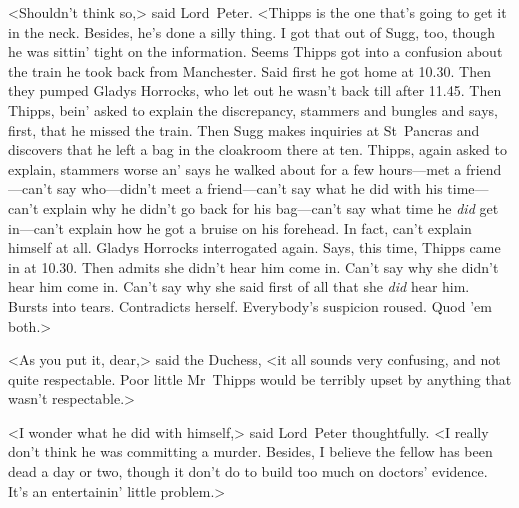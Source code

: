 <Shouldn't think so,> said Lord~Peter. <Thipps is the one that's going to get it in the neck. Besides, he's done a silly thing. I got that out of Sugg, too, though he was sittin' tight on the information. Seems Thipps got into a confusion about the train he took back from Manchester. Said first he got home at 10.30. Then they pumped Gladys Horrocks, who let out he wasn't back till after 11.45. Then Thipps, bein' asked to explain the discrepancy, stammers and bungles and says, first, that he missed the train. Then Sugg makes inquiries at St~Pancras and discovers that he left a bag in the cloakroom there at ten. Thipps, again asked to explain, stammers worse an' says he walked about for a few hours—met a friend—can't say who—didn't meet a friend—can't say what he did with his time—can't explain why he didn't go back for his bag—can't say what time he \textit{did} get in—can't explain how he got a bruise on his forehead. In fact, can't explain himself at all. Gladys Horrocks interrogated again. Says, this time, Thipps came in at 10.30. Then admits she didn't hear him come in. Can't say why she didn't hear him come in. Can't say why she said first of all that she \textit{did} hear him. Bursts into tears. Contradicts herself. Everybody's suspicion roused. Quod 'em both.>

<As you put it, dear,> said the Duchess, <it all sounds very confusing, and not quite respectable. Poor little Mr~Thipps would be terribly upset by anything that wasn't respectable.>

<I wonder what he did with himself,> said Lord~Peter thoughtfully. <I really don't think he was committing a murder. Besides, I believe the fellow has been dead a day or two, though it don't do to build too much on doctors' evidence. It's an entertainin' little problem.>

